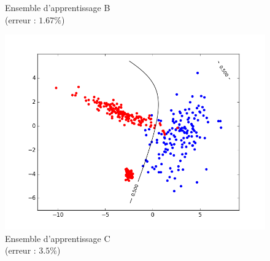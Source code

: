 \documentclass[paper=a4, fontsize=11pt]{article}
\begin{document}
\begin{figure}[h]
\begin{minipage}[b]{.3\linewidth}
  \caption*{Ensemble d'apprentissage B \\ (erreur : $1.67\%$)}
 \end{minipage} \hfill
 \begin{minipage}[b]{.3\linewidth}
  \includegraphics[scale=0.25]{figures/QDA_C_train.png}
  \caption*{Ensemble d'apprentissage C \\ (erreur : $3.5\%$)}
 \end{minipage}
\end{figure}
\end{document}
